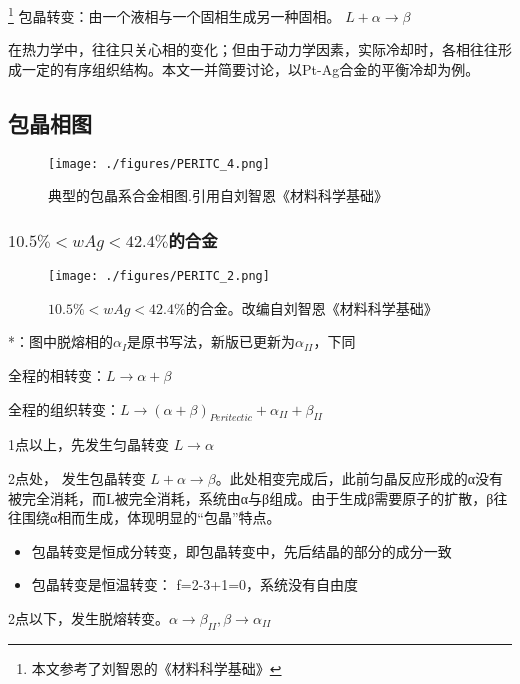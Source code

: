 
\footnote{本文参考了刘智恩的《材料科学基础》}
包晶转变：由一个液相与一个固相生成另一种固相。 $L + \alpha \rightarrow \beta$

在热力学中，往往只关心相的变化；但由于动力学因素，实际冷却时，各相往往形成一定的有序组织结构。本文一并简要讨论，以Pt-Ag合金的平衡冷却为例。

\subsection{包晶相图}

\begin{figure}[ht]
\centering
\texttt{[image: ./figures/PERITC\_4.png]}
\caption{典型的包晶系合金相图.引用自刘智恩《材料科学基础》} \label{PERITC_fig4}
\end{figure}

\subsubsection{$10.5\%<wAg<42.4\%$的合金} 
\begin{figure}[ht]
\centering
\texttt{[image: ./figures/PERITC\_2.png]}
\caption{$10.5\%<wAg<42.4\%$的合金。改编自刘智恩《材料科学基础》} \label{PERITC_fig2}
\end{figure}
*：图中脱熔相的$\alpha_I$是原书写法，新版已更新为$\alpha_{II}$，下同

全程的相转变：$L \rightarrow \alpha+\beta$

全程的组织转变：$L \rightarrow (\alpha+\beta)_{Peritectic} + \alpha_{II} + \beta_{II}$

1点以上，先发生匀晶转变 $L \rightarrow \alpha$

2点处， 发生包晶转变 $L+ \alpha \rightarrow \beta$。此处相变完成后，此前匀晶反应形成的α没有被完全消耗，而L被完全消耗，系统由α与β组成。由于生成β需要原子的扩散，β往往围绕α相而生成，体现明显的“包晶”特点。
\begin{itemize}
\item 包晶转变是恒成分转变，即包晶转变中，先后结晶的部分的成分一致
\item 包晶转变是恒温转变： f=2-3+1=0，系统没有自由度
\end{itemize}

2点以下，发生脱熔转变。$\alpha \rightarrow \beta_{II}, \beta \rightarrow \alpha_{II}$


